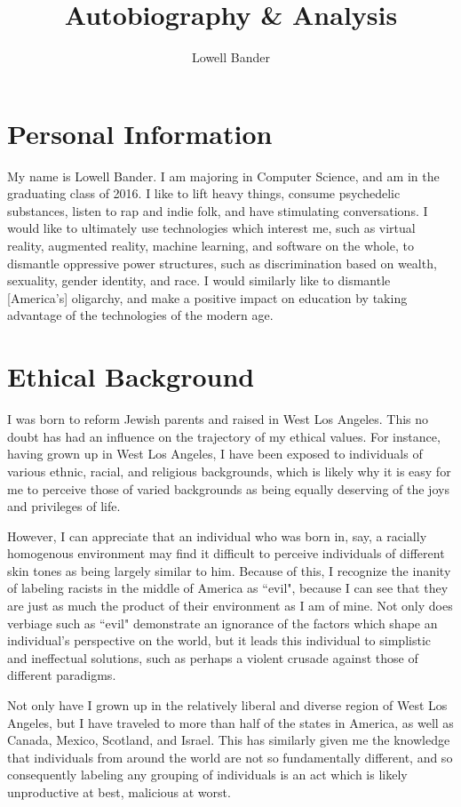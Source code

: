 \documentclass[]{article}
\begin{document}
\title{Autobiography \& Analysis}
\author{Lowell Bander}
\maketitle

\onehalfspacing
\section{Personal Information}
My name is Lowell Bander. I am majoring in Computer Science, and am in the graduating class of 2016. I like to lift heavy things, consume psychedelic substances, listen to rap and indie folk, and have stimulating conversations. I would like to ultimately use technologies which interest me, such as virtual reality, augmented reality, machine learning, and software on the whole, to dismantle oppressive power structures, such as discrimination based on wealth, sexuality, gender identity, and race. I would similarly like to dismantle [America's] oligarchy, and make a positive impact on education by taking advantage of the technologies of the modern age.

\section{Ethical Background}
I was born to reform Jewish parents and raised in West Los Angeles. This no doubt has had an influence on the trajectory of my ethical values. For instance, having grown up in West Los Angeles, I have been exposed to individuals of various ethnic, racial, and religious backgrounds, which is likely why it is easy for me to perceive those of varied backgrounds as being equally deserving of the joys and privileges of life. 

However, I can appreciate that an individual who was born in, say, a racially homogenous environment may find it difficult to perceive individuals of different skin tones as being largely similar to him. Because of this, I recognize the inanity of labeling racists in the middle of America as ``evil", because I can see that they are just as much the product of their environment as I am of mine. Not only does verbiage such as ``evil" demonstrate an ignorance of the factors which shape an individual's perspective on the world, but it leads this individual to simplistic and ineffectual solutions, such as perhaps a violent crusade against those of different paradigms.

Not only have I grown up in the relatively liberal and diverse region of West Los Angeles, but I have traveled to more than half of the states in America, as well as Canada, Mexico, Scotland, and Israel. This has similarly given me the knowledge that individuals from around the world are not so fundamentally different, and so consequently labeling any grouping of individuals is an act which is likely unproductive at best, malicious at worst.
\end{document}
